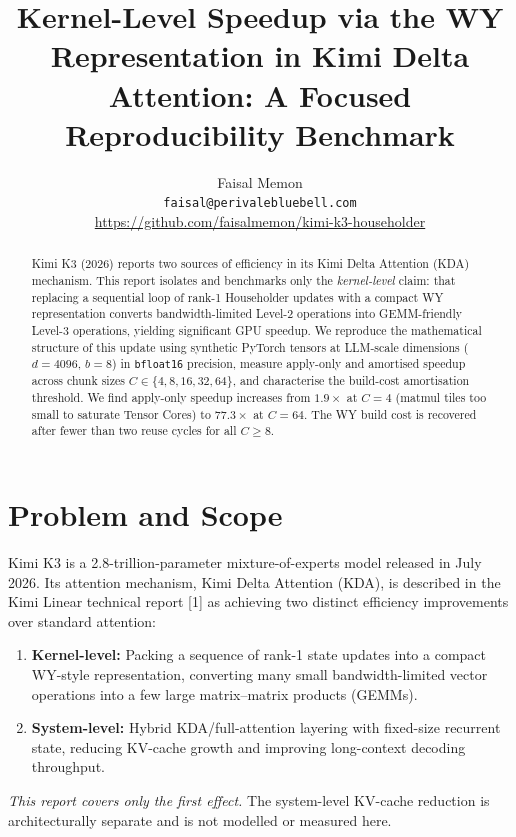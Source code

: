 \documentclass{article} %
\title{Kernel-Level Speedup via the WY Representation
in Kimi Delta Attention:
A Focused Reproducibility Benchmark}
\author{
Faisal Memon \\
\texttt{faisal@perivalebluebell.com} \\
\url{https://github.com/faisalmemon/kimi-k3-householder} \\
}
\begin{document}
\maketitle

\begin{abstract}
Kimi K3 (2026) reports two sources of efficiency in its Kimi Delta Attention (KDA)
mechanism. This report isolates and benchmarks only the \emph{kernel-level} claim:
that replacing a sequential loop of rank-1 Householder updates with a compact WY
representation converts bandwidth-limited Level-2 operations into GEMM-friendly
Level-3 operations, yielding significant GPU speedup.
We reproduce the mathematical structure of this update using synthetic PyTorch
tensors at LLM-scale dimensions ($d=4096$, $b=8$) in \texttt{bfloat16} precision,
measure apply-only and amortised speedup
across chunk sizes $C \in \{4, 8, 16, 32, 64\}$, and characterise the build-cost
amortisation threshold. We find apply-only speedup increases from $1.9\times$ at
$C=4$ (matmul tiles too small to saturate Tensor Cores) to $77.3\times$ at $C=64$.
The WY build cost is recovered after fewer than two reuse cycles for all $C \geq 8$.
\end{abstract}

\section{Problem and Scope}
\label{sec:problem}

Kimi K3 is a 2.8-trillion-parameter mixture-of-experts model released in July 2026.
Its attention mechanism, Kimi Delta Attention (KDA), is described in the Kimi Linear
technical report [1] as achieving two distinct efficiency improvements
over standard attention:

\begin{enumerate}
  \item \textbf{Kernel-level:} Packing a sequence of rank-1 state updates into a
        compact WY-style representation, converting many small bandwidth-limited
        vector operations into a few large matrix--matrix products (GEMMs).
  \item \textbf{System-level:} Hybrid KDA/full-attention layering with fixed-size
        recurrent state, reducing KV-cache growth and improving long-context decoding
        throughput.
\end{enumerate}

\emph{This report covers only the first effect.} The system-level KV-cache reduction
is architecturally separate and is not modelled or measured here.
\end{document}
